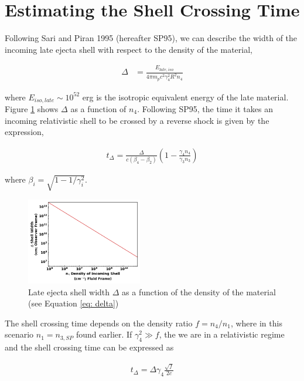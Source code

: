 \documentclass[linenumbers,twocolumn]{aastex631}
\begin{document}
\section{Estimating the Shell Crossing Time}
{
    Following Sari and Piran 1995 (hereafter SP95), we can describe the width of the incoming late ejecta shell with respect to the density of the material, 

    \begin{align}
        \Delta &= \frac{E_{late,iso}}{4 \pi m_p c^2 \gamma_4^2 R^2 n_4} \label{eq: delta}
    \end{align}

    where $E_{iso,late}\sim10^{52}$ erg is the isotropic equivalent energy of the late material. Figure \ref{fig: shell width} shows $\Delta$ as a function of $n_4$. Following SP95, the time it takes an incoming relativistic shell to be crossed by a reverse shock is given by the expression, 

    \begin{align}
        t_{\Delta} = \frac{\Delta}{c(\beta_4 - \beta_2)} \left(1-\frac{\gamma_4 n_4}{\gamma_3 n_3}\right)
    \end{align} 

    where $\beta_i = \sqrt{1 - 1/\gamma_i^2}$.

    \begin{figure}[t!]
        \centering
        \includegraphics[width=0.45\textwidth]{shell-width.png}
        \caption{Late ejecta shell width $\Delta$ as a function of the density of the material (see Equation \ref{eq: delta}) }
        \label{fig: shell width}
    \end{figure}

    The shell crossing time depends on the density ratio $f = n_4/n_1$, where in this scenario $n_1 = n_{3,SP}$ found earlier. If $\gamma_4^2 \gg f$, the we are in a relativistic regime and the shell crossing time can be expressed as 

    \begin{align}
        t_{\Delta} = \Delta \gamma_4 \frac{\sqrt{f}}{2c}
    \end{align}

}
\end{document}
